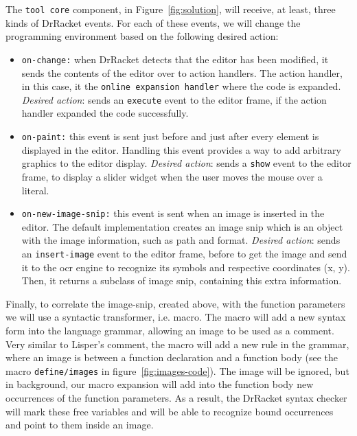 The \texttt{tool core} component, in Figure~\ref{fig:solution}, will receive, at least, three kinds of DrRacket events. For each of these events, we will change the programming environment based on the following desired action:

\begin{itemize}
	\item \texttt{on-change:} when DrRacket detects that the editor has been modified, it sends the contents of the editor over to action handlers.	The action handler, in this case, it the \texttt{online expansion handler} where the code is expanded. \textit{Desired action}: sends an \texttt{execute} event to the editor frame, if the action handler expanded the code successfully. 

	\item \texttt{on-paint:} this event is sent just before and just after every element is displayed in the editor. Handling this event provides a way to add arbitrary graphics to the editor display. \textit{Desired action}: sends a \texttt{show} event to the editor frame, to display a slider widget when the user moves the mouse over a literal.

	\item \texttt{on-new-image-snip:} this event is sent when an image is inserted in the editor. The default implementation creates an image snip which is an object with the image information, such as path and format. \textit{Desired action}: sends an \texttt{insert-image} event to the editor frame, before to get the image and send it to the \gls{ocr} engine to recognize its symbols and respective coordinates (x, y). Then, it returns a subclass of image snip, containing this extra information.
\end{itemize}

Finally, to correlate the image-snip, created above, with the function parameters we will use a syntactic transformer, i.e. macro. The macro will add a new syntax form into the language grammar, allowing an image to be used as a comment. Very similar to Lisper's comment, the macro will add a new rule in the grammar, where an image is between a function declaration and a function body (see the macro \texttt{define/images} in figure~\ref{fig:images-code}). The image will be ignored, but in background, our macro expansion will add into the function body new occurrences of the function parameters. As a result, the DrRacket syntax checker will mark these free variables and will be able to recognize bound occurrences and point to them inside an image.

